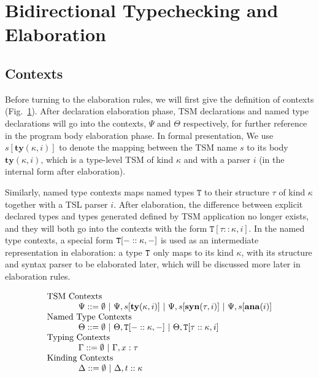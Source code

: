 \section{Bidirectional Typechecking and Elaboration}
\label{tr-semantics}

\subsection{Contexts}
Before turning to the elaboration rules, we will first give the definition of contexts (Fig.~\ref{typechecking-environment}). After declaration elaboration phase, TSM declarations and named type declarations will go into the contexts, $\Psi$ and $\Theta$ respectively, for further reference in the program body elaboration phase. In formal presentation, We use $s[\mathbf{ty}(\kappa,i)]$ to denote the mapping between the TSM name $s$ to its body $\mathbf{ty}(\kappa,i)$, which is a type-level TSM of kind $\kappa$ and with a parser $i$ (in the internal form after elaboration).

Similarly, named type contexts maps named types $\mathtt{T}$ to their structure $\tau$ of kind $\kappa$ together with a TSL parser $i$. After elaboration, the difference between explicit declared types and types generated defined by TSM application no longer exists, and they will both go into the contexts with the form $\mathtt{T}[\tau :: \kappa,i]$. In the named type contexts, a special form $\mathtt{T}[-::\kappa,-]$ is used as an intermediate representation in elaboration: a type $\mathtt{T}$ only maps to its kind $\kappa$, with its structure and syntax parser to be elaborated later, which will be discussed more later in elaboration rules.

\begin{figure}[ht]
\[
\begin{array}{l}
      \text{TSM Contexts}\\
      ~~~~~~~~~~~\Psi ::= \emptyset ~|~ \Psi, s[\mathbf{ty}(\kappa, i)] ~|~ \Psi, s[\mathbf{syn}(\tau,i)] ~|~ \Psi, s[\mathbf{ana}(i)]\\
      \text{Named Type Contexts}\\
      ~~~~~~~~~~~\Theta ::= \emptyset~|~ \Theta, \mathtt{T}[-::\kappa,-] ~|~ \Theta, \mathtt{T}[\tau :: \kappa,i]\\
      \text{Typing Contexts}\\
      ~~~~~~~~~~~\Gamma ::= \emptyset ~|~ \Gamma, x : \tau\\
      \text{Kinding Contexts}\\
      ~~~~~~~~~~~\Delta ::= \emptyset ~|~ \Delta,t::\kappa
\end{array}
\]
\label{typechecking-environment}
\end{figure}


